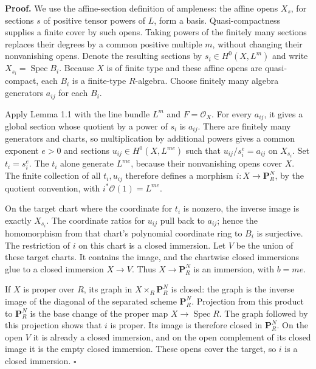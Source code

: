 \documentclass[11pt]{article}
\begin{document}
\textbf{Proof.} We use the affine-section definition of ampleness: the
affine opens \(X_s\), for sections \(s\) of positive tensor powers of
\(L\), form a basis. Quasi-compactness supplies a finite cover by such
opens. Taking powers of the finitely many sections replaces their
degrees by a common positive multiple \(m\), without changing their
nonvanishing opens. Denote the resulting sections by
\(s_i\in H^0(X,L^m)\) and write \(X_{s_i}=\operatorname{Spec}B_i\).
Because \(X\) is of finite type and these affine opens are
quasi-compact, each \(B_i\) is a finite-type \(R\)-algebra. Choose
finitely many algebra generators \(a_{ij}\) for each \(B_i\).

Apply Lemma 1.1 with the line bundle \(L^m\) and \(F=\mathcal O_X\). For
every \(a_{ij}\), it gives a global section whose quotient by a power of
\(s_i\) is \(a_{ij}\). There are finitely many generators and charts, so
multiplication by additional powers gives a common exponent \(e>0\) and
sections \(u_{ij}\in H^0(X,L^{me})\) such that \(u_{ij}/s_i^e=a_{ij}\)
on \(X_{s_i}\). Set \(t_i=s_i^e\). The \(t_i\) alone generate
\(L^{me}\), because their nonvanishing opens cover \(X\). The finite
collection of all \(t_i,u_{ij}\) therefore defines a morphism
\(i:X\to\mathbf P_R^N\), by the quotient convention, with
\(i^*\mathcal O(1)=L^{me}\).

On the target chart where the coordinate for \(t_i\) is nonzero, the
inverse image is exactly \(X_{s_i}\). The coordinate ratios for
\(u_{ij}\) pull back to \(a_{ij}\); hence the homomorphism from that
chart's polynomial coordinate ring to \(B_i\) is surjective. The
restriction of \(i\) on this chart is a closed immersion. Let \(V\) be
the union of these target charts. It contains the image, and the
chartwise closed immersions glue to a closed immersion \(X\to V\). Thus
\(X\to\mathbf P_R^N\) is an immersion, with \(b=me\).

If \(X\) is proper over \(R\), its graph in \(X\times_R\mathbf P_R^N\)
is closed: the graph is the inverse image of the diagonal of the
separated scheme \(\mathbf P_R^N\). Projection from this product to
\(\mathbf P_R^N\) is the base change of the proper map
\(X\to\operatorname{Spec}R\). The graph followed by this projection
shows that \(i\) is proper. Its image is therefore closed in
\(\mathbf P_R^N\). On the open \(V\) it is already a closed immersion,
and on the open complement of its closed image it is the empty closed
immersion. These opens cover the target, so \(i\) is a closed immersion.
\(\square\)
\end{document}
